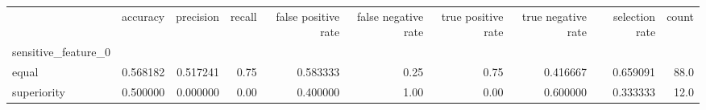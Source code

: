 \begin{tabular}{lrrrrrrrrr}
\toprule
{} &  accuracy &  precision &  recall &  false positive rate &  false negative rate &  true positive rate &  true negative rate &  selection rate &  count \\
sensitive\_feature\_0 &           &            &         &                      &                      &                     &                     &                 &        \\
\midrule
equal               &  0.568182 &   0.517241 &    0.75 &             0.583333 &                 0.25 &                0.75 &            0.416667 &        0.659091 &   88.0 \\
superiority         &  0.500000 &   0.000000 &    0.00 &             0.400000 &                 1.00 &                0.00 &            0.600000 &        0.333333 &   12.0 \\
\bottomrule
\end{tabular}
